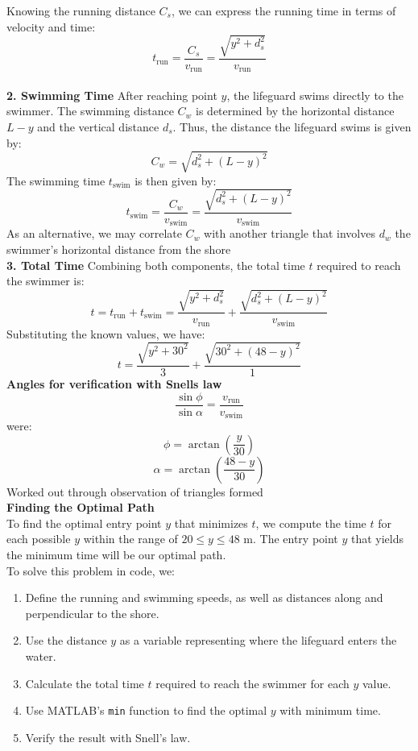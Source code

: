 \documentclass[a4paper, 12pt]{report}
\begin{document}
    Knowing the running distance \( C_s \), we can express the running time in terms of velocity and time:
    \[ t_{\text{run}} = \frac{C_s}{v_{\text{run}}} = \frac{\sqrt{y^2 + d_s^2}}{v_{\text{run}}} \]\\[8pt]
    \textbf{2. Swimming Time} After reaching point \( y \), the lifeguard swims directly to the swimmer. The swimming distance \( C_w \) is determined by the horizontal distance \( L - y \) and the vertical distance \( d_s \). Thus, the distance the lifeguard swims is given by:
    \[ C_w = \sqrt{d_s^2 + (L - y)^2} \]
    The swimming time \( t_{\text{swim}} \) is then given by:
    \[ t_{\text{swim}} = \frac{C_w}{v_{\text{swim}}} = \frac{\sqrt{d_s^2 + (L - y)^2}}{v_{\text{swim}}} \]
    As an alternative, we may correlate $C_w$ with another triangle that involves \( d_w \) the swimmer's horizontal distance from the shore\\[8pt]
    \textbf{3. Total Time} Combining both components, the total time \( t \) required to reach the swimmer is:
    \[ t = t_{\text{run}} + t_{\text{swim}} = \frac{\sqrt{y^2 + d_s^2}}{v_{\text{run}}} + \frac{\sqrt{d_s^2 + (L - y)^2}}{v_{\text{swim}}} \]
    Substituting the known values, we have:
    \[ t = \frac{\sqrt{y^2 + 30^2}}{3} + \frac{\sqrt{30^2 + (48 - y)^2}}{1} \]
    \textbf{Angles for verification with Snells law}\\
    \[\frac{\sin \phi}{\sin \alpha} = \frac{v_{\text{run}}}{v_{\text{swim}}}\]
    were:
    \[\phi = \arctan\left(\frac{y}{30}\right)\]
    \[\alpha = \arctan\left(\frac{48-y}{30}\right)\]
    Worked out through observation of triangles formed\\[8pt]
    \textbf{Finding the Optimal Path}\\
    To find the optimal entry point \( y \) that minimizes \( t \), we compute the time \( t \) for each possible \( y \) within the range of \( 20 \leq y \leq 48 \) m. The entry point \( y \) that yields the minimum time will be our optimal path.\\[1em]
    To solve this problem in code, we:
    \begin{enumerate}[itemsep=-0.1cm]
        \item Define the running and swimming speeds, as well as distances along and perpendicular to the shore.
        \item Use the distance \( y \) as a variable representing where the lifeguard enters the water.
        \item Calculate the total time \( t \) required to reach the swimmer for each \( y \) value.
        \item Use MATLAB’s \texttt{min} function to find the optimal \( y \) with minimum time.
        \item Verify the result with Snell's law.
    \end{enumerate}
    
\end{document}

